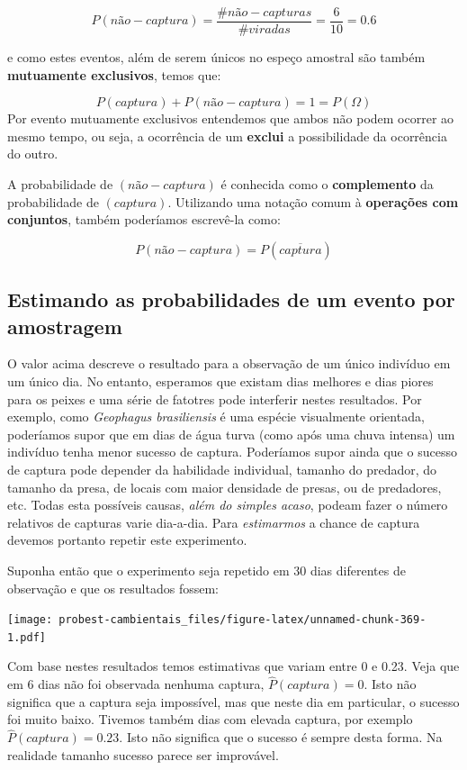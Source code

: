 \documentclass[
]{book}
\begin{document}
\[P(não-captura) = \frac{\#não-capturas}{\#viradas} = \frac{6}{10} = 0.6\]

e como estes eventos, além de serem únicos no espeço amostral são também \textbf{mutuamente exclusivos}, temos que:

\[P(captura) + P(não-captura) = 1 = P(\Omega)\]
Por evento mutuamente exclusivos entendemos que ambos não podem ocorrer ao mesmo tempo, ou seja, a ocorrência de um \textbf{exclui} a possibilidade da ocorrência do outro.

A probabilidade de \((não-captura)\) é conhecida como o \textbf{complemento} da probabilidade de \((captura)\). Utilizando uma notação comum à \textbf{operações com conjuntos}, também poderíamos escrevê-la como:

\[P(não-captura) = P(\overline{captura})\]

\hypertarget{estimando-as-probabilidades-de-um-evento-por-amostragem}{%
\subsection{Estimando as probabilidades de um evento por amostragem}\label{estimando-as-probabilidades-de-um-evento-por-amostragem}}

O valor acima descreve o resultado para a observação de um único indivíduo em um único dia. No entanto, esperamos que existam dias melhores e dias piores para os peixes e uma série de fatotres pode interferir nestes resultados. Por exemplo, como \emph{Geophagus brasiliensis} é uma espécie visualmente orientada, poderíamos supor que em dias de água turva (como após uma chuva intensa) um indivíduo tenha menor sucesso de captura. Poderíamos supor ainda que o sucesso de captura pode depender da habilidade individual, tamanho do predador, do tamanho da presa, de locais com maior densidade de presas, ou de predadores, etc. Todas esta possíveis causas, \emph{além do simples acaso}, podeam fazer o número relativos de capturas varie dia-a-dia. Para \emph{estimarmos} a chance de captura devemos portanto repetir este experimento.

Suponha então que o experimento seja repetido em 30 dias diferentes de observação e que os resultados fossem:

\texttt{[image: probest-cambientais\_files/figure-latex/unnamed-chunk-369-1.pdf]}

Com base nestes resultados temos estimativas que variam entre 0 e 0.23. Veja que em 6 dias não foi observada nenhuma captura, \(\hat{P}(captura) = 0\). Isto não significa que a captura seja impossível, mas que neste dia em particular, o sucesso foi muito baixo. Tivemos também dias com elevada captura, por exemplo \(\hat{P}(captura) = 0.23\). Isto não significa que o sucesso é sempre desta forma. Na realidade tamanho sucesso parece ser improvável.
\end{document}
